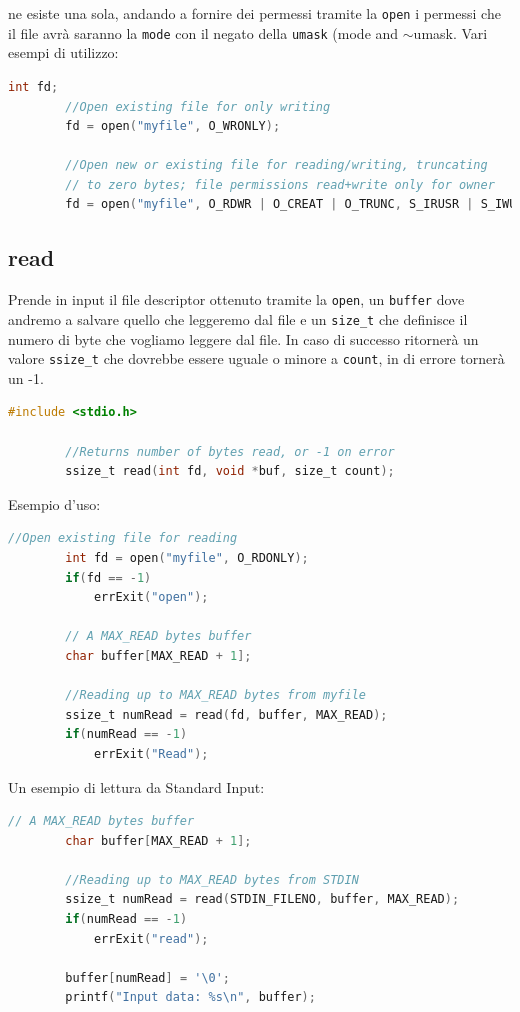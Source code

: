\documentclass[a4paper, 12pt]{book}
\begin{document}
    ne esiste una sola, andando a fornire dei permessi tramite 
    la \verb|open| i permessi che il file avrà saranno 
    la \verb|mode| con il negato della \verb|umask| (mode and
    $\sim$umask. 
    Vari esempi di utilizzo:
    \begin{lstlisting}[language=C]
        int fd;
        //Open existing file for only writing
        fd = open("myfile", O_WRONLY);

        //Open new or existing file for reading/writing, truncating 
        // to zero bytes; file permissions read+write only for owner
        fd = open("myfile", O_RDWR | O_CREAT | O_TRUNC, S_IRUSR | S_IWUSR);
    \end{lstlisting}
    
    \subsection{read}

    Prende in input il file descriptor ottenuto tramite la 
     \verb|open|, un \verb|buffer| dove andremo a salvare quello che 
    leggeremo dal file e un \verb|size_t| che definisce il numero di byte 
    che vogliamo leggere dal file. In caso di successo ritornerà 
    un valore \verb|ssize_t| che dovrebbe essere uguale o minore a \verb|count|, in di
    errore tornerà un -1.
    \begin{lstlisting}[language=C]
        #include <stdio.h> 

        //Returns number of bytes read, or -1 on error
        ssize_t read(int fd, void *buf, size_t count);
    \end{lstlisting}
    Esempio d'uso:
    \begin{lstlisting}[language=C]
        //Open existing file for reading
        int fd = open("myfile", O_RDONLY);
        if(fd == -1)
            errExit("open");
        
        // A MAX_READ bytes buffer
        char buffer[MAX_READ + 1];

        //Reading up to MAX_READ bytes from myfile
        ssize_t numRead = read(fd, buffer, MAX_READ);
        if(numRead == -1)
            errExit("Read");
    \end{lstlisting}
    Un esempio di lettura da Standard Input:
    \begin{lstlisting}[language=C]
        // A MAX_READ bytes buffer
        char buffer[MAX_READ + 1];

        //Reading up to MAX_READ bytes from STDIN
        ssize_t numRead = read(STDIN_FILENO, buffer, MAX_READ);
        if(numRead == -1)
            errExit("read");
        
        buffer[numRead] = '\0';
        printf("Input data: %s\n", buffer);
    \end{lstlisting}
\end{document}
